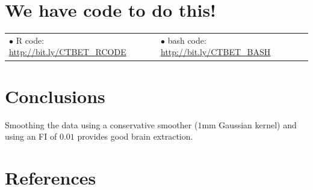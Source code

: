\documentclass[final]{beamer}\usepackage[]{graphicx}\usepackage[]{color}
\begin{document}
\begin{frame}[fragile]
\begin{minipage}{0.39\linewidth}
\section{We have code to do this!}

\begin{tabular}{m{0.5\linewidth} m{0.5\linewidth} }
$\bullet$ R code: \url{http://bit.ly/CTBET_RCODE} & $\bullet$ bash code: \url{http://bit.ly/CTBET_BASH}
\end{tabular}


\section{Conclusions}
\vspace*{-0.5cm}
Smoothing the data using a conservative smoother ($1$mm Gaussian kernel) and using an FI of $0.01$ provides good brain extraction.




\section{References}
\setlength\bibitemsep{0pt}
\printbibliography[heading=none]\vspace*{-0.5cm}





\end{minipage}
\end{frame}
\end{document}
